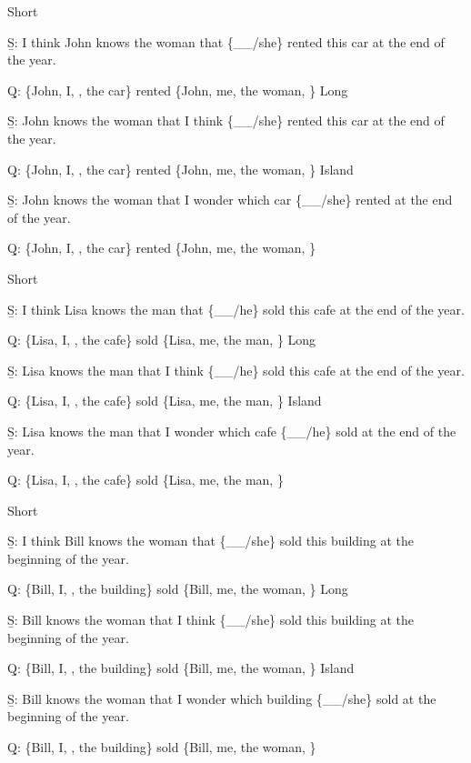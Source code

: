 \pex 
\a Short\par\nobreak
\beginsubsub 
\b{S:} I think John knows the woman that \{\_\_/she\} rented this car at the end of the year.\par\nobreak
\b{Q:} \{John, I, , the car\} rented \{John, me, the woman, \}
\endsubsub
\a Long\par\nobreak
\beginsubsub
\b{S:} John knows the woman that I think \{\_\_/she\} rented this car at the end of the year.\par\nobreak
\b{Q:} \{John, I, , the car\} rented \{John, me, the woman, \}
\endsubsub
\a Island\par\nobreak
\beginsubsub
\b{S:} John knows the woman that I wonder which car \{\_\_/she\} rented at the end of the year.\par\nobreak
\b{Q:} \{John, I, , the car\} rented \{John, me, the woman, \}
\endsubsub
\xe

\pex 
\a Short\par\nobreak
\beginsubsub 
\b{S:} I think Lisa knows the man that \{\_\_/he\} sold this cafe at the end of the year.\par\nobreak
\b{Q:} \{Lisa, I, , the cafe\} sold \{Lisa, me, the man, \}
\endsubsub
\a Long\par\nobreak
\beginsubsub
\b{S:} Lisa knows the man that I think \{\_\_/he\} sold this cafe at the end of the year.\par\nobreak
\b{Q:} \{Lisa, I, , the cafe\} sold \{Lisa, me, the man, \}
\endsubsub
\a Island\par\nobreak
\beginsubsub
\b{S:} Lisa knows the man that I wonder which cafe \{\_\_/he\} sold at the end of the year.\par\nobreak
\b{Q:} \{Lisa, I, , the cafe\} sold \{Lisa, me, the man, \}
\endsubsub
\xe

\pex 
\a Short\par\nobreak
\beginsubsub 
\b{S:} I think Bill knows the woman that \{\_\_/she\} sold this building at the beginning of the year.\par\nobreak
\b{Q:} \{Bill, I, , the building\} sold \{Bill, me, the woman, \}
\endsubsub
\a Long\par\nobreak
\beginsubsub
\b{S:} Bill knows the woman that I think \{\_\_/she\} sold this building at the beginning of the year.\par\nobreak
\b{Q:} \{Bill, I, , the building\} sold \{Bill, me, the woman, \}
\endsubsub
\a Island\par\nobreak
\beginsubsub
\b{S:} Bill knows the woman that I wonder which building \{\_\_/she\} sold at the beginning of the year.\par\nobreak
\b{Q:} \{Bill, I, , the building\} sold \{Bill, me, the woman, \}
\endsubsub
\xe

